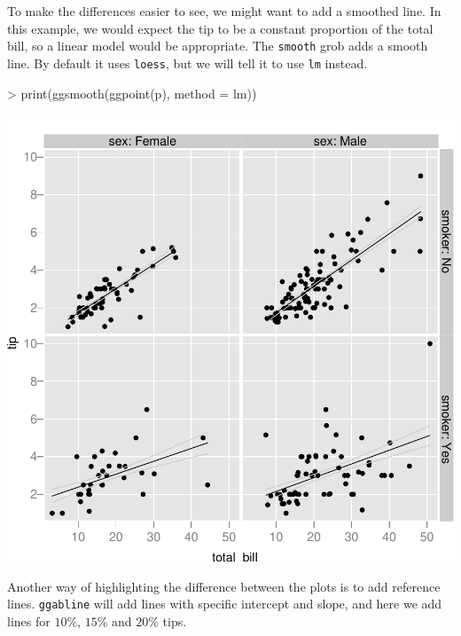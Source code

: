 \documentclass[]{article}
\begin{document}
To make the differences easier to see, we might want to add a smoothed line.  In this example, we would expect the tip to be a constant proportion of the total bill, so a linear model would be appropriate.  The \texttt{smooth} grob adds a smooth line.  By default it uses \texttt{loess}, but we will tell it to use \texttt{lm} instead. 

\begin{Schunk}
\begin{Sinput}
> print(ggsmooth(ggpoint(p), method = lm))
\end{Sinput}
\end{Schunk}
\includegraphics{introduction-007}

Another way of highlighting the difference between the plots is to add reference lines.  \texttt{ggabline} will add lines with specific intercept and slope, and here we add lines for $10\%$, $15\%$ and $20\%$ tips.
\end{document}
